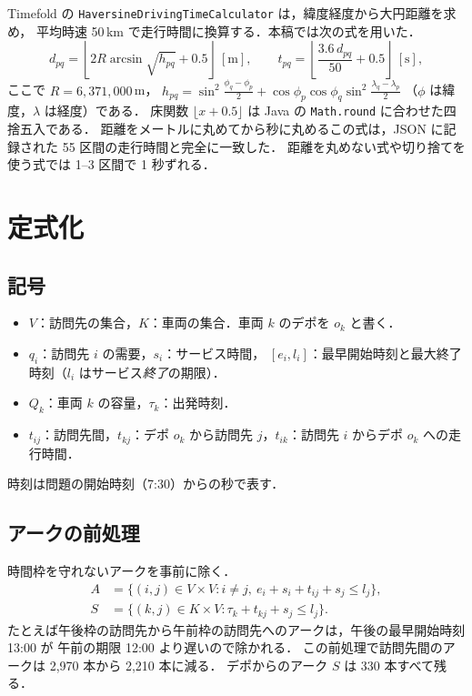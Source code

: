 \documentclass[11pt,a4paper]{ltjsarticle}
\newcommand{\Vset}{V}
\newcommand{\Kset}{K}
\begin{document}
Timefold の \texttt{HaversineDrivingTimeCalculator} は，緯度経度から大円距離を求め，
平均時速 50\,km で走行時間に換算する．本稿では次の式を用いた．
\begin{equation}
  d_{pq} = \left\lfloor 2R \arcsin\sqrt{h_{pq}} + 0.5 \right\rfloor \ [\mathrm{m}], \qquad
  t_{pq} = \left\lfloor \frac{3.6\, d_{pq}}{50} + 0.5 \right\rfloor \ [\mathrm{s}],
\end{equation}
ここで $R = 6{,}371{,}000$\,m，
$h_{pq} = \sin^2\frac{\phi_q-\phi_p}{2} + \cos\phi_p\cos\phi_q\sin^2\frac{\lambda_q-\lambda_p}{2}$
（$\phi$ は緯度，$\lambda$ は経度）である．
床関数 $\lfloor x + 0.5 \rfloor$ は Java の \texttt{Math.round} に合わせた四捨五入である．
距離をメートルに丸めてから秒に丸めるこの式は，JSON に記録された 55 区間の走行時間と完全に一致した．
距離を丸めない式や切り捨てを使う式では 1--3 区間で 1 秒ずれる．

\section{定式化}

\subsection{記号}

\begin{itemize}
  \item $\Vset$：訪問先の集合，$\Kset$：車両の集合．車両 $k$ のデポを $o_k$ と書く．
  \item $q_i$：訪問先 $i$ の需要，$s_i$：サービス時間，
        $[e_i, l_i]$：最早開始時刻と最大終了時刻（$l_i$ はサービス\emph{終了}の期限）．
  \item $Q_k$：車両 $k$ の容量，$\tau_k$：出発時刻．
  \item $t_{ij}$：訪問先間，$t_{kj}$：デポ $o_k$ から訪問先 $j$，$t_{ik}$：訪問先 $i$ からデポ $o_k$ への走行時間．
\end{itemize}
時刻は問題の開始時刻（7:30）からの秒で表す．

\subsection{アークの前処理}

時間枠を守れないアークを事前に除く．
\begin{align}
  A &= \{(i,j) \in \Vset\times\Vset : i\neq j,\ e_i + s_i + t_{ij} + s_j \le l_j\}, \\
  S &= \{(k,j) \in \Kset\times\Vset : \tau_k + t_{kj} + s_j \le l_j\}.
\end{align}
たとえば午後枠の訪問先から午前枠の訪問先へのアークは，午後の最早開始時刻 13:00 が
午前の期限 12:00 より遅いので除かれる．
この前処理で訪問先間のアークは 2,970 本から 2,210 本に減る．
デポからのアーク $S$ は 330 本すべて残る．
\end{document}
